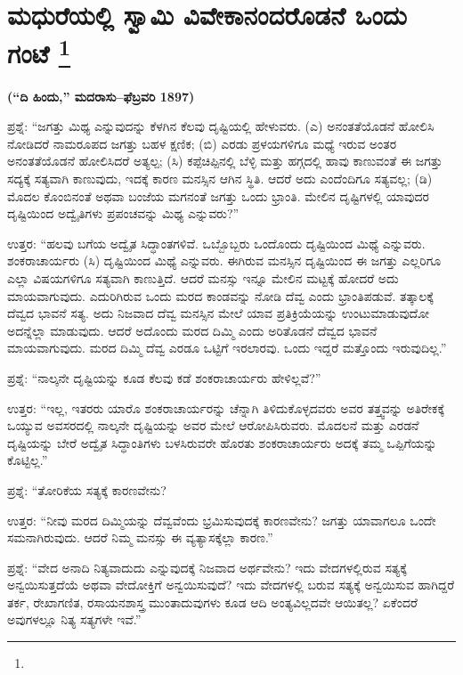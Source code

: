 
\chapter[ಮಧುರೆಯಲ್ಲಿ ಸ್ವಾಮಿ ವಿವೇಕಾನಂದರೊಡನೆ ಒಂದು ಗಂಟೆ ]{ಮಧುರೆಯಲ್ಲಿ ಸ್ವಾಮಿ ವಿವೇಕಾನಂದರೊಡನೆ ಒಂದು ಗಂಟೆ \protect\footnote{}}

\centerline{\textbf{(“ದಿ ಹಿಂದು,” ಮದರಾಸು–ಫೆಬ್ರವರಿ 1897)}}

ಪ್ರಶ್ನೆ: “ಜಗತ್ತು ಮಿಥ್ಯ ಎನ್ನುವುದನ್ನು ಕೆಳಗಿನ ಕೆಲವು ದೃಷ್ಟಿಯಲ್ಲಿ ಹೇಳುವರು. (ಎ) ಅನಂತತೆಯೊಡನೆ ಹೋಲಿಸಿ ನೋಡಿದರೆ ನಾಮರೂಪದ ಜಗತ್ತು ಬಹಳ ಕ್ಷಣಿಕ; (ಬಿ) ಎರಡು ಪ್ರಳಯಗಳಿಗೂ ಮಧ್ಯೆ ಇರುವ ಅಂತರ ಅನಂತತೆಯೊಡನೆ ಹೋಲಿಸಿದರೆ ಅತ್ಯಲ್ಪ; (ಸಿ) ಕಪ್ಪೆಚಿಪ್ಪಿನಲ್ಲಿ ಬೆಳ್ಳಿ ಮತ್ತು ಹಗ್ಗದಲ್ಲಿ ಹಾವು ಕಾಣುವಂತೆ ಈ ಜಗತ್ತು ಸದ್ಯಕ್ಕೆ ಸತ್ಯವಾಗಿ ಕಾಣುವುದು, ಇದಕ್ಕೆ ಕಾರಣ ಮನಸ್ಸಿನ ಆಗಿನ ಸ್ಥಿತಿ. ಆದರೆ ಅದು ಎಂದೆಂದಿಗೂ ಸತ್ಯವಲ್ಲ; (ಡಿ) ಮೊದಲ ಕೊಂಬಿನಂತೆ ಅಥವಾ ಬಂಜೆಯ ಮಗನಂತೆ ಜಗತ್ತು ಒಂದು ಭ್ರಾಂತಿ. ಮೇಲಿನ ದೃಷ್ಟಿಗಳಲ್ಲಿ ಯಾವುದರ ದೃಷ್ಟಿಯಿಂದ ಅದ್ವೈತಿಗಳು ಪ್ರಪಂಚವನ್ನು ಮಿಥ್ಯ ಎನ್ನುವರು?”

ಉತ್ತರ: “ಹಲವು ಬಗೆಯ ಅದ್ವೈತ ಸಿದ್ಧಾಂತಗಳಿವೆ. ಒಬ್ಬೊಬ್ಬರು ಒಂದೊಂದು ದೃಷ್ಟಿಯಿಂದ ಮಿಥ್ಯೆ ಎನ್ನುವರು. ಶಂಕರಾಚಾರ್ಯರು (ಸಿ) ದೃಷ್ಟಿಯಿಂದ ಮಿಥ್ಯೆ ಎನ್ನುವರು. ಈಗಿರುವ ಮನಸ್ಸಿನ ದೃಷ್ಟಿಯಿಂದ ಈ ಜಗತ್ತು ಎಲ್ಲರಿಗೂ ಎಲ್ಲಾ ವಿಷಯಗಳಿಗೂ ಸತ್ಯವಾಗಿ ಕಾಣುತ್ತಿದೆ. ಆದರೆ ಮನಸ್ಸು ಇನ್ನೂ ಮೇಲಿನ ಮಟ್ಟಕ್ಕೆ ಹೋದರೆ ಅದು ಮಾಯವಾಗುವುದು. ಎದುರಿಗಿರುವ ಒಂದು ಮರದ ಕಾಂಡವನ್ನು ನೋಡಿ ದೆವ್ವ ಎಂದು ಭ್ರಾಂತಿಪಡುವೆ. ತತ್ಕಾಲಕ್ಕೆ ದೆವ್ವದ ಭಾವನೆ ಸತ್ಯ. ಅದು ನಿಜವಾದ ದೆವ್ವ ಮನಸ್ಸಿನ ಮೇಲೆ ಯಾವ ಪ್ರತಿಕ್ರಿಯೆಯನ್ನು ಉಂಟುಮಾಡುವುದೋ ಅದನ್ನೆಲ್ಲಾ ಮಾಡುವುದು. ಆದರೆ ಅದೊಂದು ಮರದ ದಿಮ್ಮಿ ಎಂದು ಅರಿತೊಡನೆ ದೆವ್ವದ ಭಾವನೆ ಮಾಯವಾಗುವುದು. ಮರದ ದಿಮ್ಮಿ ದೆವ್ವ ಎರಡೂ ಒಟ್ಟಿಗೆ ಇರಲಾರವು. ಒಂದು ಇದ್ದರೆ ಮತ್ತೊಂದು ಇರುವುದಿಲ್ಲ.”

ಪ್ರಶ್ನೆ: “ನಾಲ್ಕನೇ ದೃಷ್ಟಿಯನ್ನು ಕೂಡ ಕೆಲವು ಕಡೆ ಶಂಕರಾಚಾರ್ಯರು ಹೇಳಿಲ್ಲವೆ?”

ಉತ್ತರ: “ಇಲ್ಲ, ಇತರರು ಯಾರೊ ಶಂಕರಾಚಾರ್ಯರನ್ನು ಚೆನ್ನಾಗಿ ತಿಳಿದುಕೊಳ್ಳ\-ದವರು ಅವರ ತತ್ತ್ವವನ್ನು ಅತಿರೇಕಕ್ಕೆ ಒಯ್ಯುವ ಅವಸರದಲ್ಲಿ ನಾಲ್ಕನೇ ದೃಷ್ಟಿಯನ್ನು ಅವರ ಮೇಲೆ ಆರೋಪಿಸಿರುವರು. ಮೊದಲನೆ ಮತ್ತು ಎರಡನೆ ದೃಷ್ಟಿಯನ್ನು ಬೇರೆ ಅದ್ವೈತ ಸಿದ್ಧಾಂತಿಗಳು ಬಳಸಿರುವರೇ ಹೊರತು ಶಂಕರಾಚಾರ್ಯರು ಅದಕ್ಕೆ ತಮ್ಮ ಒಪ್ಪಿಗೆಯನ್ನು ಕೊಟ್ಟಿಲ್ಲ.”

ಪ್ರಶ್ನೆ: “ತೋರಿಕೆಯ ಸತ್ಯಕ್ಕೆ ಕಾರಣವೇನು?

ಉತ್ತರ: “ನೀವು ಮರದ ದಿಮ್ಮಿಯನ್ನು ದೆವ್ವವೆಂದು ಭ್ರಮಿಸುವುದಕ್ಕೆ ಕಾರಣವೇನು? ಜಗತ್ತು ಯಾವಾಗಲೂ ಒಂದೇ ಸಮನಾಗಿರುವುದು. ಆದರೆ ನಿಮ್ಮ ಮನಸ್ಸು ಈ ವ್ಯತ್ಯಾಸಕ್ಕೆಲ್ಲಾ ಕಾರಣ.”

ಪ್ರಶ್ನೆ: “ವೇದ ಅನಾದಿ ನಿತ್ಯವಾದುದು ಎನ್ನುವುದಕ್ಕೆ ನಿಜವಾದ ಅರ್ಥವೇನು? ಇದು ವೇದಗಳಲ್ಲಿರುವ ಸತ್ಯಕ್ಕೆ ಅನ್ವಯಿಸುತ್ತದೆಯೆ ಅಥವಾ ವೇದೋಕ್ತಿಗೆ ಅನ್ವಯಿಸುವುದೆ? ಇದು ವೇದಗಳಲ್ಲಿ ಬರುವ ಸತ್ಯಕ್ಕೆ ಅನ್ವಯಿಸುವ ಹಾಗಿದ್ದರೆ ತರ್ಕ, ರೇಖಾಗಣಿತ, ರಸಾಯನಶಾಸ್ತ್ರ ಮುಂತಾದುವುಗಳು ಕೂಡ ಆದಿ ಅಂತ್ಯವಿಲ್ಲದವೇ ಆಯಿತಲ್ಲ? ಏಕೆಂದರೆ ಅವುಗಳಲ್ಲೂ ನಿತ್ಯ ಸತ್ಯಗಳೇ ಇವೆ.”

